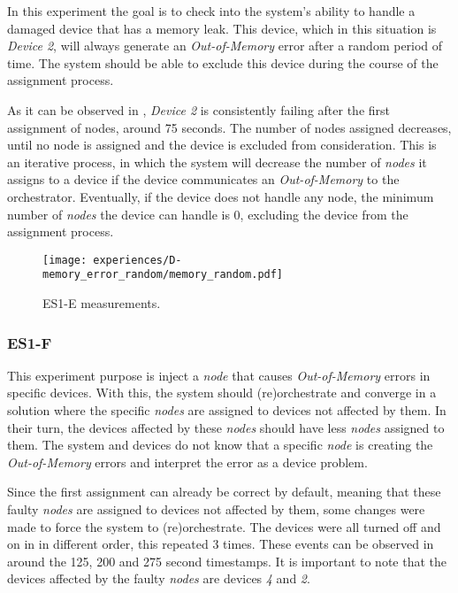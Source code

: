 In this experiment the goal is to check into the system's ability to handle a damaged device that has a memory leak. This device, which in this situation is \textit{Device 2}, will always generate an \textit{Out-of-Memory} error after a random period of time. The system should be able to exclude this device during the course of the assignment process.

As it can be observed in , \textit{Device 2} is consistently failing after the first assignment of nodes, around 75 seconds. The number of nodes assigned decreases, until no node is assigned and the device is excluded from consideration. This is an iterative process, in which the system will decrease the number of \textit{nodes} it assigns to a device if the device communicates an \textit{Out-of-Memory} to the orchestrator. Eventually, if the device does not handle any node, the minimum number of \textit{nodes} the device can handle is 0, excluding the device from the assignment process.

\begin{figure}[h]
\centering
\texttt{[image: experiences/D-memory\_error\_random/memory\_random.pdf]}
\caption[ES1-E measurements]{ES1-E measurements.}\label{fig:experiment_d_graph}
\end{figure}


\subsubsection{ES1-F}

This experiment purpose is inject a \textit{node} that causes \textit{Out-of-Memory} errors in specific devices. With this, the system should (re)orchestrate and converge in a solution where the specific \textit{nodes} are assigned to devices not affected by them. In their turn, the devices affected by these \textit{nodes} should have less \textit{nodes} assigned to them. The system and devices do not know that a specific \textit{node} is creating the \textit{Out-of-Memory} errors and interpret the error as a device problem.

Since the first assignment can already be correct by default, meaning that these faulty \textit{nodes} are assigned to devices not affected by them, some changes were made to force the system to (re)orchestrate. The devices were all turned off and on in in different order, this repeated 3 times. These events can be observed in  around the 125, 200 and 275 second timestamps. It is important to note that the devices affected by the faulty \textit{nodes} are devices \textit{4} and \textit{2}.

